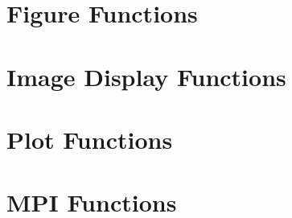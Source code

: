 \documentclass{book}
\begin{document}
\section{Figure Functions}




\section{Image Display Functions}






\section{Plot Functions}









\section{MPI Functions}














\end{document}
